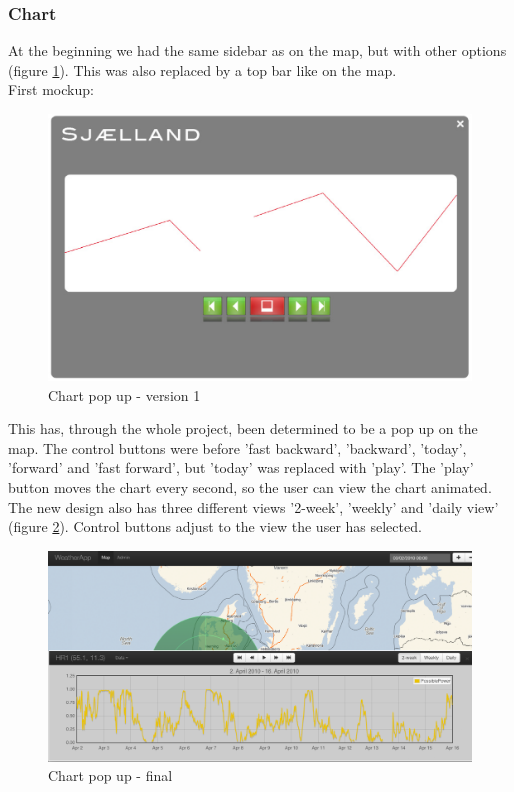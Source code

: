\subsubsection{Chart}
At the beginning we had the same sidebar as on the map, but with other options (figure \ref{fig:chart_v1}). This was also replaced by a top bar like on the map.\\
First mockup: 
\begin{figure}[htbp]
   \centering
   \includegraphics[width=1\linewidth]{figure/design_chart_v1.eps}
   \caption{Chart pop up - version 1}
   \label{fig:chart_v1}
\end{figure}

This has, through the whole project, been determined to be a pop up on the map.
The control buttons were before 'fast backward', 'backward', 'today', 'forward' and 'fast forward', but 'today' was replaced with 'play'. The 'play' button moves the chart every second, so the user can view the chart animated.\\
The new design also has three different views '2-week', 'weekly' and 'daily view' (figure \ref{fig:chart_final}). Control buttons adjust to the view the user has selected.

\begin{figure}[htbp]
   \centering
   \includegraphics[width=1\linewidth]{figure/design_chart_final.eps}
   \caption{Chart pop up - final}
   \label{fig:chart_final}
\end{figure}




